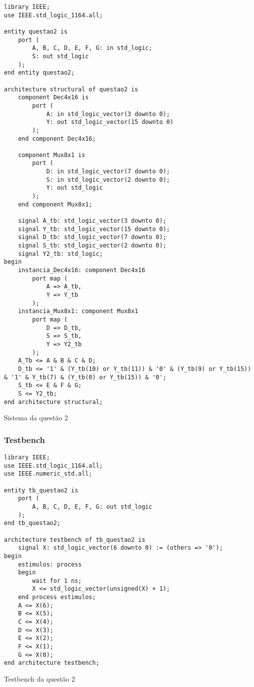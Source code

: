 \documentclass[a4paper,12pt]{article}
\newenvironment{code}{\captionsetup{type=listing}}{}
\begin{document}
\begin{code}
    \begin{verbatim}
library IEEE;
use IEEE.std_logic_1164.all;

entity questao2 is
    port (
        A, B, C, D, E, F, G: in std_logic;
        S: out std_logic
    );
end entity questao2;

architecture structural of questao2 is
    component Dec4x16 is
        port (
            A: in std_logic_vector(3 downto 0);
            Y: out std_logic_vector(15 downto 0)
        );
    end component Dec4x16;

    component Mux8x1 is
        port (
            D: in std_logic_vector(7 downto 0);
            S: in std_logic_vector(2 downto 0);
            Y: out std_logic
        );
    end component Mux8x1;

    signal A_tb: std_logic_vector(3 downto 0);
    signal Y_tb: std_logic_vector(15 downto 0);
    signal D_tb: std_logic_vector(7 downto 0);
    signal S_tb: std_logic_vector(2 downto 0);
    signal Y2_tb: std_logic;
begin
    instancia_Dec4x16: component Dec4x16
        port map (
            A => A_tb,
            Y => Y_tb
        );
    instancia_Mux8x1: component Mux8x1
        port map (
            D => D_tb,
            S => S_tb,
            Y => Y2_tb
        );
    A_Tb <= A & B & C & D;
    D_tb <= '1' & (Y_tb(10) or Y_tb(11)) & '0' & (Y_tb(9) or Y_tb(15)) & '1' & Y_tb(7) & (Y_tb(0) or Y_tb(15)) & '0';
    S_tb <= E & F & G;
    S <= Y2_tb;
end architecture structural;
    \end{verbatim}
    \caption{Sistema da questão 2}
\end{code}

\subsubsection{Testbench}
\begin{code}
    \begin{verbatim}
library IEEE;
use IEEE.std_logic_1164.all;
use IEEE.numeric_std.all;

entity tb_questao2 is
    port (
        A, B, C, D, E, F, G: out std_logic
    );
end tb_questao2;

architecture testbench of tb_questao2 is
    signal X: std_logic_vector(6 downto 0) := (others => '0');
begin
    estimulos: process
    begin
        wait for 1 ns;
        X <= std_logic_vector(unsigned(X) + 1);
    end process estimulos;
    A <= X(6);
    B <= X(5);
    C <= X(4);
    D <= X(3);
    E <= X(2);
    F <= X(1);
    G <= X(0);
end architecture testbench;
    \end{verbatim}
    \caption{Testbench da questão 2}
\end{code}
\end{document}
